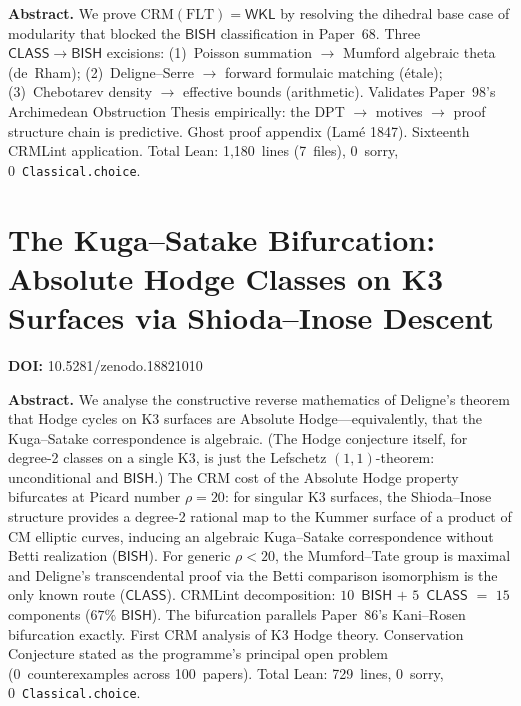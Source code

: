 \documentclass[11pt,a4paper]{article}
\begin{document}
\bigskip
\noindent\textbf{Abstract.}
We prove $\mathrm{CRM}(\mathrm{FLT}) = \mathsf{WKL}$ by resolving the dihedral base case of modularity that blocked the $\mathsf{BISH}$ classification in Paper~68. Three $\mathsf{CLASS} \to \mathsf{BISH}$ excisions: (1)~Poisson summation $\to$ Mumford algebraic theta (de~Rham); (2)~Deligne--Serre $\to$ forward formulaic matching (\'etale); (3)~Chebotarev density $\to$ effective bounds (arithmetic). Validates Paper~98's Archimedean Obstruction Thesis empirically: the DPT $\to$ motives $\to$ proof structure chain is predictive. Ghost proof appendix (Lam\'e 1847). Sixteenth CRMLint application. Total Lean: 1,180~lines (7~files), 0~sorry, 0~\texttt{Classical.choice}.

\newpage

\section{The Kuga--Satake Bifurcation: Absolute Hodge Classes on K3 Surfaces via Shioda--Inose Descent}
\label{sec:p100}
\textbf{DOI:} 10.5281/zenodo.18821010

\bigskip
\noindent\textbf{Abstract.}
We analyse the constructive reverse mathematics of Deligne's theorem that Hodge cycles on K3 surfaces are Absolute Hodge---equivalently, that the Kuga--Satake correspondence is algebraic. (The Hodge conjecture itself, for degree-2 classes on a single K3, is just the Lefschetz $(1,1)$-theorem: unconditional and $\mathsf{BISH}$.) The CRM cost of the Absolute Hodge property bifurcates at Picard number $\rho = 20$: for singular K3 surfaces, the Shioda--Inose structure provides a degree-2 rational map to the Kummer surface of a product of CM elliptic curves, inducing an algebraic Kuga--Satake correspondence without Betti realization ($\mathsf{BISH}$). For generic $\rho < 20$, the Mumford--Tate group is maximal and Deligne's transcendental proof via the Betti comparison isomorphism is the only known route ($\mathsf{CLASS}$). CRMLint decomposition: $10$~$\mathsf{BISH}$ $+$ $5$~$\mathsf{CLASS}$ $=$ $15$ components ($67\%$ $\mathsf{BISH}$). The bifurcation parallels Paper~86's Kani--Rosen bifurcation exactly. First CRM analysis of K3 Hodge theory. Conservation Conjecture stated as the programme's principal open problem (0~counterexamples across 100~papers). Total Lean: 729~lines, 0~sorry, 0~\texttt{Classical.choice}.
\end{document}
